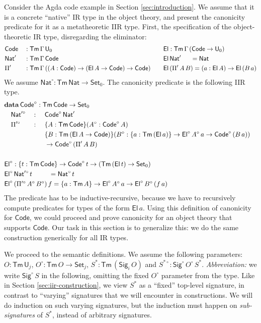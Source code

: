 \documentclass[acmsmall,screen,review]{acmart}
\newcommand{\msf}[1]{{\mathsf{#1}}}
\newcommand{\mbf}[1]{{\mathbf{#1}}}
\newcommand{\data}{\mbf{data}}
\newcommand{\U}{\msf{U}}
\newcommand{\Set}{\msf{Set}}
\newcommand{\Nat}{\msf{Nat}}
\newcommand{\El}{\msf{El}}
\newcommand{\Sig}{\msf{Sig}}
\newcommand{\Code}{\msf{Code}}
\newcommand{\Tm}{\msf{Tm}}
\newcommand{\w}{\circ}
\begin{document}
\begin{example}\label{ex:code-canonicity}
Consider the Agda code example in Section \ref{sec:introduction}. We assume that it is a concrete
``native'' IR type in the object theory, and present the canonicity predicate for it as a
metatheoretic IIR type. First, the specification of the object-theoretic IR type, disregarding the
eliminator:
\begin{alignat*}{4}
  &\Code &&: \Tm\,\Gamma\,\U_0 && \El : \Tm\,\Gamma\,(\Code \to \U_0) \\
  &\Nat' &&: \Tm\,\Gamma\,\Code && \El\,\Nat'\hspace{1.5em} = \Nat \\
  &\Pi'  &&: \Tm\,\Gamma\,((A : \Code) \to (\El\,A \to \Code) \to \Code)\hspace{1em} && \El\,(\Pi'\,A\,B) = (a : \El\,A) \to \El\,(B\,a)
\end{alignat*}
We assume $\Nat^\w : \Tm\,\Nat \to \Set_0$. The canonicity predicate is the following IIR type.
\begin{alignat*}{4}
  &\rlap{$\data\,\Code^\w : \Tm\,\Code \to \Set_0$}\\
  &\quad\Nat'^\w &&: \,\,&& \Code^\w\,\Nat'\\
  &\quad\Pi'^\w  &&: \,\,&&\{A : \Tm\,\Code\}(A^\w : \Code^\w\,A)\\
  &\quad         &&  && \{B : \Tm\,(\El\,A \to \Code)\}(B^\w : \{a : \Tm\,(\El\,a)\} \to \El^\w\,A^\w\,a \to \Code^\w\,(B\,a))\\
  &\quad         &&  && \to \Code^\w\,(\Pi'\,A\,B)\\
  &\rlap{}\\
  &\rlap{$\El^\w : \{t : \Tm\,\Code\} \to \Code^\w\,t \to (\Tm\,(\El\,t) \to \Set_0)$}\\
  &\rlap{$\El^\w\,\Nat'^\w\,t \hspace{2.55em}= \Nat^\w\,t$}  \\
  &\rlap{$\El^\w\,(\Pi'^\w\,A^\w\,B^\w)\,f = \{a : \Tm\,A\} \to \El^\w\,A^\w\,a \to \El^\w\,B^\w\,(f\,a)$}
\end{alignat*}
The predicate has to be inductive-recursive, because we have to recursively compute predicates for
types of the form $\El\,a$. Using this definition of canonicity for $\Code$, we could proceed and
prove canonicity for an object theory that supports $\Code$. Our task in this section is to
generalize this: we do the same construction generically for all IR types.
\end{example}

We proceed to the semantic definitions. We assume the following parameters: $O : \Tm\,\U_j$, $O^\w :
\Tm\,O \to \Set_j$, $S^* : \Tm\,(\Sig_i\,O)$ and $S^{*\w} :
\Sig^\w\,O^\w\,S^*$. \emph{Abbreviation:} we write $\Sig^\w\,S$ in the following, omitting the fixed
$O^\w$ parameter from the type.  Like in Section \ref{sec:iir-construction}, we view $S^*$ as a
``fixed'' top-level signature, in contrast to ``varying'' signatures that we will encounter in
constructions. We will do induction on such varying signatures, but the induction must happen on
\emph{sub-signatures} of $S^*$, instead of arbitrary signatures.
\end{document}
